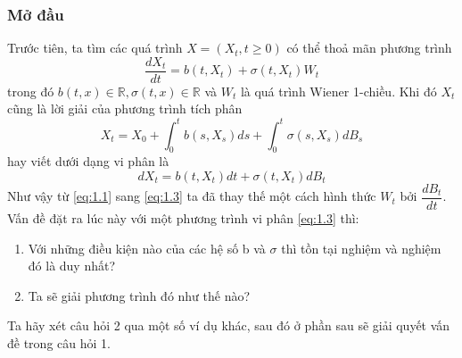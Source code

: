 \documentclass[14pt,a4paper]{article}
\numberwithin{equation}{section}
\begin{document}
\subsubsection{Mở đầu}
Trước tiên, ta tìm các quá trình $X=(X_t,t\geq 0)$ có thể thoả mãn phương trình
\begin{equation}\label{eq:1.1}
	\dfrac{dX_t}{dt}=b(t,X_t)+\sigma(t,X_t)W_t
\end{equation}
trong đó $b(t,x)\in\mathbb{R},\sigma(t,x)\in\mathbb{R}$ và $W_t$ là quá trình Wiener 1-chiều. Khi đó $X_t$ cũng là lời giải của phương trình tích phân
\begin{equation}\label{eq:1.2}
	X_t=X_0+\int_0^tb(s,X_s)ds+\int_0^t\sigma(s,X_s)dB_s
\end{equation}
hay viết dưới dạng vi phân là
\begin{equation}\label{eq:1.3}
	dX_t=b(t,X_t)dt+\sigma(t,X_t)dB_t
\end{equation}
Như vậy từ \eqref{eq:1.1} sang \eqref{eq:1.3} ta đã thay thế một cách hình thức $W_t$ bởi $\dfrac{dB_t}{dt}$. Vấn đề đặt ra lúc này với một phương trình vi phân \eqref{eq:1.3} thì:
\begin{enumerate}[(1)]
	\item Với những điều kiện nào của các hệ số b và $\sigma$ thì tồn tại nghiệm và nghiệm đó là duy nhất?
	\item Ta sẽ giải phương trình đó như thế nào?
\end{enumerate}
Ta hãy xét câu hỏi 2 qua một số ví dụ khác, sau đó ở phần sau sẽ giải quyết vấn đề trong câu hỏi 1.
\end{document}
